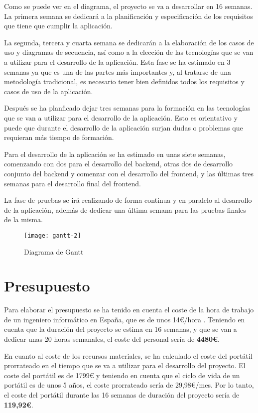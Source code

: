 Como se puede ver en el diagrama, el proyecto se va a desarrollar en 16 semanas. La
primera semana se dedicará a la planificación y especificación de los requisitos
que tiene que cumplir la aplicación.

La segunda, tercera y cuarta semana se dedicarán a la elaboración de los casos de uso
y diagramas de secuencia, así como a la elección de las tecnologías que se van a
utilizar para el desarrollo de la aplicación. Esta fase se ha estimado en 3 semanas
ya que es una de las partes más importantes y, al tratarse de una metodología tradicional,
es necesario tener bien definidos todos los requisitos y casos de uso de la aplicación.

Después se ha planficado dejar tres semanas para la formación en las tecnologías que
se van a utilizar para el desarrollo de la aplicación. Esto es orientativo y puede que
durante el desarrollo de la aplicación surjan dudas o problemas que requieran más
tiempo de formación.

Para el desarrollo de la aplicación se ha estimado en unas siete semanas, comenzando
con dos para el desarrollo del backend, otras dos de desarrollo conjunto del backend
y comenzar con el desarrollo del frontend, y las últimas tres semanas para el desarrollo
final del frontend.

La fase de pruebas se irá realizando de forma continua y en paralelo al desarrollo
de la aplicación, además de dedicar una última semana para las pruebas finales de
la misma.

\begin{figure}[H]
  \centering
  \texttt{[image: gantt-2]}
  \caption{Diagrama de Gantt}
  \label{fig:gantt}
\end{figure}

\section{Presupuesto}
Para elaborar el presupuesto se ha tenido en cuenta el coste de la hora de trabajo
de un ingeniero informático en España, que es de unos 14€/hora \cite{coste-hora}.
Teniendo en cuenta que la duración del proyecto se estima en 16 semanas, y que
se van a dedicar unas 20 horas semanales, el coste del personal sería de \textbf{4480€}.

\vspace{1cm}

En cuanto al coste de los recursos materiales, se ha calculado el coste del portátil
prorrateado en el tiempo que se va a utilizar para el desarrollo del proyecto. El
coste del portátil es de 1799€ \cite{portatil} y teniendo en cuenta que el ciclo de vida de un
portátil es de unos 5 años, el coste prorrateado sería de 29,98€/mes. Por lo tanto,
el coste del portátil durante las 16 semanas de duración del proyecto sería de
\textbf{119,92€}.

